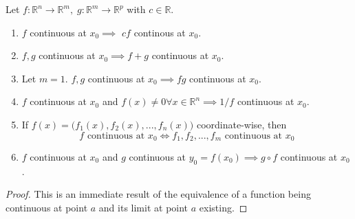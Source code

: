   \begin{lemma}
    \label{thm:properties-of-continuous-functions}
    Let $f: \mathbb{R}^n \to \mathbb{R}^m, \; g: \mathbb{R}^m \to \mathbb{R}^p$ with $c \in \mathbb{R}$. 
    \begin{enumerate}
      \item $f$ continuous at $x_0 \implies$ $c f$ continous at $x_0$. 
      \item $f, g$ continuous at $x_0 \implies f + g$ continuous at $x_0$. 
      \item Let $m = 1$. $f, g$ continuous at $x_0 \implies f g$ continuous at $x_0$. 
      \item $f$ continuous at $x_0$ and $f(x) \neq 0 \forall x \in \mathbb{R}^n \implies 1 / f$ continuous at $x_0$. 
      \item If $f(x) = \big( f_1(x), f_2(x), ..., f_n(x) \big)$ coordinate-wise, then 
      \begin{equation}
        f \text{ continuous at } x_0 \iff f_1, f_2, ..., f_m \text{ continuous  at } x_0
      \end{equation}
      \item $f$ continuous at $x_0$ and $g$ continuous at $y_0 = f(x_0) \implies g \circ f$ continuous at $x_0$. 
    \end{enumerate}
  \end{lemma}
  \begin{proof}
    This is an immediate result of the equivalence of a function being continuous at point $a$ and its limit at point $a$ existing. 
  \end{proof}

